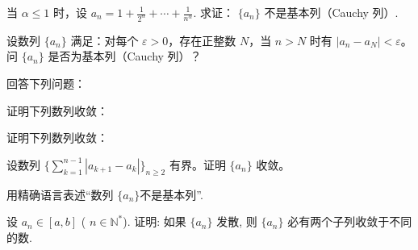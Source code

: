 \noindent\begin{minipage}{\textwidth}
当  $ \alpha\leqslant1 $ 时，设  $ a_{n}=1+\frac{1}{2^{\alpha}}+\cdots+\frac{1}{n^{\alpha}} $. 求证： $ \{a_{n}\} $ 不是基本列（Cauchy 列）.
\end{minipage}\par\vfill
\newpage
\noindent\begin{minipage}{\textwidth}
设数列 $\{a_n\}$ 满足：对每个 $\varepsilon>0$，存在正整数 $N$，当 $n>N$ 时有 $|a_n-a_N|<\varepsilon$。问 $\{a_n\}$ 是否为基本列（Cauchy 列）？
\end{minipage}\par\vfill
\noindent\begin{minipage}{\textwidth}
回答下列问题：
\end{minipage}\par\vfill
\noindent\begin{minipage}{\textwidth}
证明下列数列收敛：
\end{minipage}\par\vfill
\newpage
\noindent\begin{minipage}{\textwidth}
证明下列数列收敛：
\end{minipage}\par\vfill
\noindent\begin{minipage}{\textwidth}
设数列 $\{\sum_{k=1}^{n-1}|a_{k+1}-a_k|\}_{n\ge2}$ 有界。证明 $\{a_n\}$ 收敛。
\end{minipage}\par\vfill
\noindent\begin{minipage}{\textwidth}
用精确语言表述“数列 $ \{a_n\} $不是基本列”.
\end{minipage}\par\vfill
\newpage
\noindent\begin{minipage}{\textwidth}
设  $ a_n \in [a, b] $ ( $ n \in \mathbb{N}^* $). 证明: 如果  $ \{a_n\} $ 发散, 则  $ \{a_n\} $ 必有两个子列收敛于不同的数.
\end{minipage}\par\vfill
